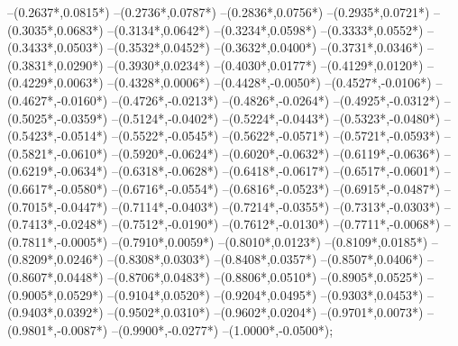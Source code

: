 {	--({0.2637*\xskala},{0.0815*\yskala})
	--({0.2736*\xskala},{0.0787*\yskala})
	--({0.2836*\xskala},{0.0756*\yskala})
	--({0.2935*\xskala},{0.0721*\yskala})
	--({0.3035*\xskala},{0.0683*\yskala})
	--({0.3134*\xskala},{0.0642*\yskala})
	--({0.3234*\xskala},{0.0598*\yskala})
	--({0.3333*\xskala},{0.0552*\yskala})
	--({0.3433*\xskala},{0.0503*\yskala})
	--({0.3532*\xskala},{0.0452*\yskala})
	--({0.3632*\xskala},{0.0400*\yskala})
	--({0.3731*\xskala},{0.0346*\yskala})
	--({0.3831*\xskala},{0.0290*\yskala})
	--({0.3930*\xskala},{0.0234*\yskala})
	--({0.4030*\xskala},{0.0177*\yskala})
	--({0.4129*\xskala},{0.0120*\yskala})
	--({0.4229*\xskala},{0.0063*\yskala})
	--({0.4328*\xskala},{0.0006*\yskala})
	--({0.4428*\xskala},{-0.0050*\yskala})
	--({0.4527*\xskala},{-0.0106*\yskala})
	--({0.4627*\xskala},{-0.0160*\yskala})
	--({0.4726*\xskala},{-0.0213*\yskala})
	--({0.4826*\xskala},{-0.0264*\yskala})
	--({0.4925*\xskala},{-0.0312*\yskala})
	--({0.5025*\xskala},{-0.0359*\yskala})
	--({0.5124*\xskala},{-0.0402*\yskala})
	--({0.5224*\xskala},{-0.0443*\yskala})
	--({0.5323*\xskala},{-0.0480*\yskala})
	--({0.5423*\xskala},{-0.0514*\yskala})
	--({0.5522*\xskala},{-0.0545*\yskala})
	--({0.5622*\xskala},{-0.0571*\yskala})
	--({0.5721*\xskala},{-0.0593*\yskala})
	--({0.5821*\xskala},{-0.0610*\yskala})
	--({0.5920*\xskala},{-0.0624*\yskala})
	--({0.6020*\xskala},{-0.0632*\yskala})
	--({0.6119*\xskala},{-0.0636*\yskala})
	--({0.6219*\xskala},{-0.0634*\yskala})
	--({0.6318*\xskala},{-0.0628*\yskala})
	--({0.6418*\xskala},{-0.0617*\yskala})
	--({0.6517*\xskala},{-0.0601*\yskala})
	--({0.6617*\xskala},{-0.0580*\yskala})
	--({0.6716*\xskala},{-0.0554*\yskala})
	--({0.6816*\xskala},{-0.0523*\yskala})
	--({0.6915*\xskala},{-0.0487*\yskala})
	--({0.7015*\xskala},{-0.0447*\yskala})
	--({0.7114*\xskala},{-0.0403*\yskala})
	--({0.7214*\xskala},{-0.0355*\yskala})
	--({0.7313*\xskala},{-0.0303*\yskala})
	--({0.7413*\xskala},{-0.0248*\yskala})
	--({0.7512*\xskala},{-0.0190*\yskala})
	--({0.7612*\xskala},{-0.0130*\yskala})
	--({0.7711*\xskala},{-0.0068*\yskala})
	--({0.7811*\xskala},{-0.0005*\yskala})
	--({0.7910*\xskala},{0.0059*\yskala})
	--({0.8010*\xskala},{0.0123*\yskala})
	--({0.8109*\xskala},{0.0185*\yskala})
	--({0.8209*\xskala},{0.0246*\yskala})
	--({0.8308*\xskala},{0.0303*\yskala})
	--({0.8408*\xskala},{0.0357*\yskala})
	--({0.8507*\xskala},{0.0406*\yskala})
	--({0.8607*\xskala},{0.0448*\yskala})
	--({0.8706*\xskala},{0.0483*\yskala})
	--({0.8806*\xskala},{0.0510*\yskala})
	--({0.8905*\xskala},{0.0525*\yskala})
	--({0.9005*\xskala},{0.0529*\yskala})
	--({0.9104*\xskala},{0.0520*\yskala})
	--({0.9204*\xskala},{0.0495*\yskala})
	--({0.9303*\xskala},{0.0453*\yskala})
	--({0.9403*\xskala},{0.0392*\yskala})
	--({0.9502*\xskala},{0.0310*\yskala})
	--({0.9602*\xskala},{0.0204*\yskala})
	--({0.9701*\xskala},{0.0073*\yskala})
	--({0.9801*\xskala},{-0.0087*\yskala})
	--({0.9900*\xskala},{-0.0277*\yskala})
	--({1.0000*\xskala},{-0.0500*\yskala});
}

